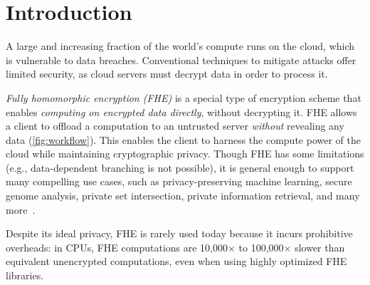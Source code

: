 \chapter{Introduction}\label{sec:intro}

A large and increasing fraction of the world's compute runs on the cloud,
which is vulnerable to data breaches.
Conventional techniques to mitigate attacks offer limited 
security, as cloud servers must decrypt data in order to process it.

\figWorkflow

\emph{Fully homomorphic encryption (FHE)} is a special type of encryption scheme
that enables \emph{computing on encrypted data directly}, without decrypting it.
FHE allows a client to offload a computation
to an untrusted server \emph{without} revealing any data (\autoref{fig:workflow}).
This enables the client to harness the compute power of the cloud while maintaining cryptographic privacy.
Though FHE has some limitations (e.g., data-dependent branching is not possible), 
it is general enough to support many compelling use cases,
such as privacy-preserving machine learning, secure genome analysis, private set intersection,
private information retrieval, and many more~\cite{kim2020semi,gilad:icml16:cryptonets,han:aaai19:logistic,han:iacr18:efficient,juvekar2018gazelle,DBLP:conf/ccs/ChenLR17,DBLP:conf/tcc/GentryH19}. 

Despite its ideal privacy, FHE is rarely used today because it incurs prohibitive overheads:
in CPUs, FHE computations are 10,000$\times$ to 100,000$\times$
slower than equivalent unencrypted computations, even when using highly optimized FHE libraries.

